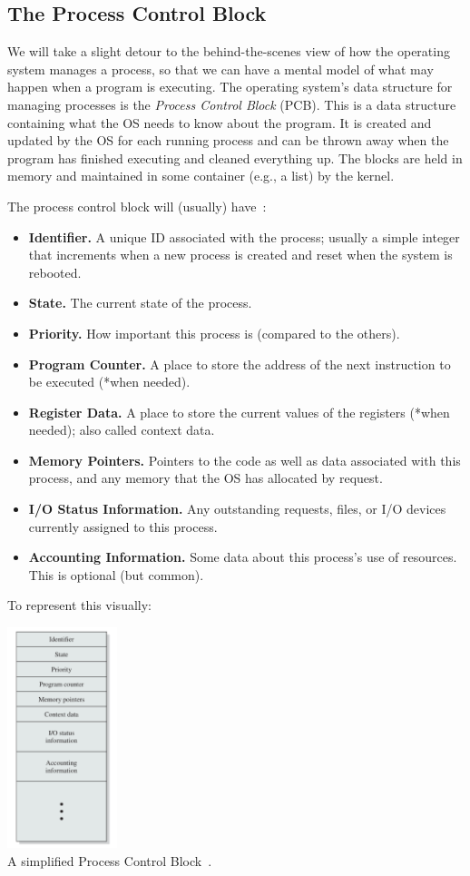 \documentclass[a4paper]{report}
\begin{document}
\subsection*{The Process Control Block}
We will take a slight detour to the behind-the-scenes view of how the operating system manages a process, so that we can have a mental model of what may happen when a program is executing. The operating system's data structure for managing processes is the \textit{Process Control Block} (PCB). This is a data structure containing what the OS needs to know about the program. It is created and updated by the OS for each running process and can be thrown away when the program has finished executing and cleaned everything up. The blocks are held in memory and maintained in some container (e.g., a list) by the kernel.

The process control block will (usually) have~\cite{osi}:
\begin{itemize}
	\item \textbf{Identifier.} A unique ID associated with the process; usually a simple integer that increments when a new process is created and reset when the system is rebooted.
	\item \textbf{State.} The current state of the process.
	\item \textbf{Priority.} How important this process is (compared to the others).
	\item \textbf{Program Counter.} A place to store the address of the next instruction to be executed (*when needed).
	\item \textbf{Register Data.} A place to store the current values of the registers (*when needed); also called context data.
	\item \textbf{Memory Pointers.} Pointers to the code as well as data associated with this process, and any memory that the OS has allocated by request.
	\item \textbf{I/O Status Information.} Any outstanding requests, files, or I/O devices currently assigned to this process.
	\item \textbf{Accounting Information.} Some data about this process's use of resources. This is optional (but common).
\end{itemize}

To represent this visually:

\begin{center}
	\includegraphics[width=0.24\textwidth]{images/pcb.png}\\
	A simplified Process Control Block~\cite{osi}.
\end{center}
\end{document}
